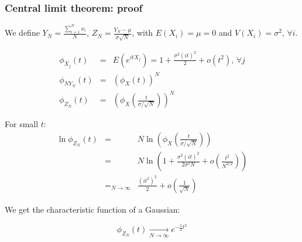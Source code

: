\documentclass[9pt]{beamer}
\begin{document}
\begin{frame}
 \frametitle{Central limit theorem: proof}
 
 We define $Y_N = \frac{\sum_{i=1}^N x_i}{N}$, $Z_N = \frac{Y_N - \mu}{\sigma \sqrt{N}}$, with $E(X_i) = \mu = 0$ and $V(X_i) = \sigma^2,\,\forall i$.
 
 \begin{eqnarray}
  \phi_{X_j}(t) & = & E(e^{itX_j}) = 1 + \frac{\sigma^2 (it)^2}{2} + o(t^2), \,\forall j \nonumber\\
  \phi_{NY_N}(t) & = & \left( \phi_X (t)\right)^N \nonumber\\
  \phi_{Z_N}(t) & = & \left( \phi_X \left( \frac{t}{\sigma/\sqrt{N}}\right) \right)^N \nonumber
 \end{eqnarray}
 
 For small $t$:
 \begin{eqnarray}
  \ln \phi_{Z_N}(t) & = & N \ln \left( \phi_X \left( \frac{t}{\sigma/\sqrt{N}} \right) \right)\nonumber\\
  & = & N \ln \left(1 + \frac{\sigma^2 (it)^2}{2\sigma^2 N} + o\left( \frac{t^2}{N^{3/2}} \right) \right)\nonumber\\
  & =_{N\to\infty} &  \frac{(it^2)^2}{2} + o\left( \frac{1}{\sqrt{N}}\right)
 \end{eqnarray}

 We get the characteristic function of a Gaussian:
 
 $$\phi_{Z_N} (t) \xrightarrow[N\to\infty]{} e^{-\frac{1}{2} t^2}$$

\end{frame}
\end{document}
